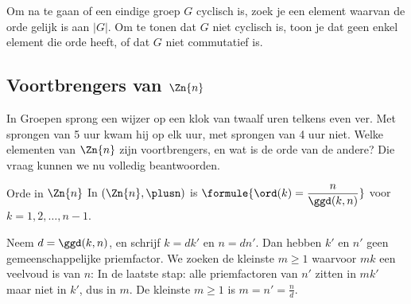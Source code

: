 
\begin{werkwijze}
Om na te gaan of een eindige groep $G$ cyclisch is, zoek je een element waarvan de orde gelijk is aan $|G|$. Om te tonen dat $G$ niet cyclisch is, toon je dat geen enkel element die orde heeft, of dat $G$ niet commutatief is.
\end{werkwijze}

\begin{oefeningen}
\end{oefeningen}

\subsection{Voortbrengers van \texorpdfstring{$\Zn{n}$}{Zn}}

In Groepen sprong een wijzer op een klok van twaalf uren telkens even ver. Met sprongen van 5 uur kwam hij op elk uur, met sprongen van 4 uur niet. Welke elementen van $\Zn{n}$ zijn voortbrengers, en wat is de orde van de andere? Die vraag kunnen we nu volledig beantwoorden.

\begin{theorie}
\begin{stelling}{Orde in $\Zn{n}$}
In $(\Zn{n}, \plusn)$ is \qquad $\formule{\ord(k) = \dfrac{n}{\ggd(k, n)}}$ \qquad voor $k = 1, 2, \ldots, n - 1$.
\end{stelling}

\begin{bewijs}
Neem $d = \ggd(k, n)$, en schrijf $k = dk'$ en $n = dn'$. Dan hebben $k'$ en $n'$ geen gemeenschappelijke priemfactor. We zoeken de kleinste $m \geqslant 1$ waarvoor $mk$ een veelvoud is van $n$:
In de laatste stap: alle priemfactoren van $n'$ zitten in $mk'$ maar niet in $k'$, dus in $m$. De kleinste $m \geqslant 1$ is $m = n' = \tfrac{n}{d}$.
\end{bewijs}
\end{theorie}

